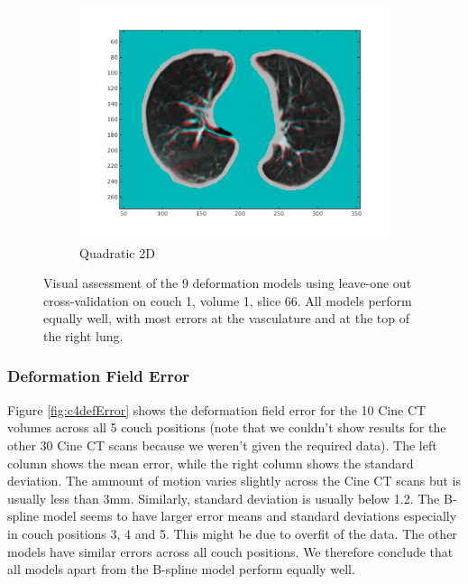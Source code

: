 \documentclass[11pt,a4paper,oneside]{report}
\begin{document}
\begin{figure}
\begin{subfigure}[b]{0.33\textwidth}
    \includegraphics[width=\textwidth, trim=0 50 0 0,clip=true]{figures/task4/visAss_m9.png}
    \caption{Quadratic 2D}
  \end{subfigure}

    \caption{Visual assessment of the 9 deformation models using leave-one out cross-validation on couch 1, volume 1, slice 66. All models perform equally well, with most errors at the vasculature and at the top of the right lung.}
  \label{fig:c4visAss}
  
\end{figure}

\subsubsection*{Deformation Field Error}

Figure \ref{fig:c4defError} shows the deformation field error for the 10 Cine CT volumes across all 5 couch positions (note that we couldn't show results for the other 30 Cine CT scans because we weren't given the required data). The left column shows the mean error, while the right column shows the standard deviation. The ammount of motion varies slightly across the Cine CT scans but is usually less than 3mm. Similarly, standard deviation is usually below 1.2. The B-spline model seems to have larger error means and standard deviations especially in couch positions 3, 4 and 5. This might be due to overfit of the data. The other models have similar errors across all couch positions. We therefore conclude that all models apart from the B-spline model perform equally well. 
\end{document}
